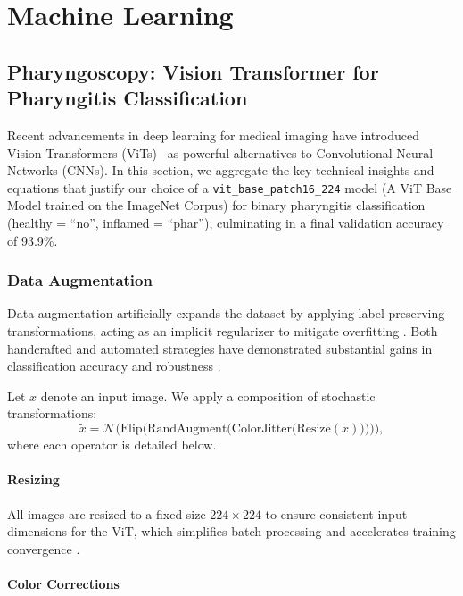 \chapter{Machine Learning}

\section{Pharyngoscopy: Vision Transformer for Pharyngitis Classification}

Recent advancements in deep learning for medical imaging have introduced Vision Transformers (ViTs)~\cite{vit} as powerful alternatives to Convolutional Neural Networks (CNNs). In this section, we aggregate the key technical insights and equations that justify our choice of a \texttt{vit\_base\_patch16\_224} model (A ViT Base Model trained on the ImageNet Corpus) for binary pharyngitis classification (healthy = “no”, inflamed = “phar”), culminating in a final validation accuracy of 93.9\%.~\cite{patch}\cite{imagenet}

\subsection{Data Augmentation}
Data augmentation artificially expands the dataset by applying label‐preserving transformations, acting as an implicit regularizer to mitigate overfitting \cite{buslaev2018albumentations}. Both handcrafted and automated strategies have demonstrated substantial gains in classification accuracy and robustness \cite{cubuk2020randaugment}. \par

Let $x$ denote an input image. We apply a composition of stochastic transformations:
\[
\tilde{x} = \mathcal{N}\bigl(\text{Flip}\bigl(\text{RandAugment}\bigl(\text{ColorJitter}\bigl(\text{Resize}(x)\bigr)\bigr)\bigr)\bigr),
\]
where each operator is detailed below.

\subsubsection{Resizing}
All images are resized to a fixed size $224\times224$ to ensure consistent input dimensions for the ViT, which simplifies batch processing and accelerates training convergence \cite{wikipediaDataAugmentation}.  

\subsubsection{Color Corrections}
